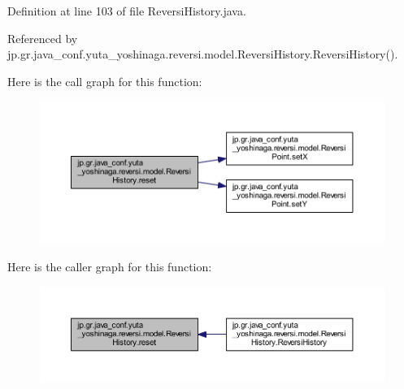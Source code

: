 Definition at line 103 of file Reversi\+History.\+java.



Referenced by jp.\+gr.\+java\+\_\+conf.\+yuta\+\_\+yoshinaga.\+reversi.\+model.\+Reversi\+History.\+Reversi\+History().

Here is the call graph for this function\+:
\nopagebreak
\begin{figure}[H]
\begin{center}
\leavevmode
\includegraphics[width=350pt]{classjp_1_1gr_1_1java__conf_1_1yuta__yoshinaga_1_1reversi_1_1model_1_1_reversi_history_aee0155159a017671c2b18c1d8229d8d1_cgraph}
\end{center}
\end{figure}
Here is the caller graph for this function\+:
\nopagebreak
\begin{figure}[H]
\begin{center}
\leavevmode
\includegraphics[width=350pt]{classjp_1_1gr_1_1java__conf_1_1yuta__yoshinaga_1_1reversi_1_1model_1_1_reversi_history_aee0155159a017671c2b18c1d8229d8d1_icgraph}
\end{center}
\end{figure}
\mbox{\label{classjp_1_1gr_1_1java__conf_1_1yuta__yoshinaga_1_1reversi_1_1model_1_1_reversi_history_a8584f37692c128381951ddc55d551d59}} 
